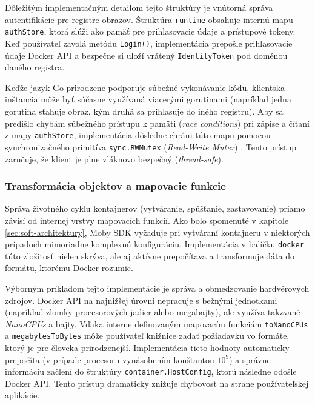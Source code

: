 \documentclass[
 program=infpvs,
  language=slovak,
  figures=false,
  tables=false,
  sourcecodes,
  glossaries,
  index
]{kidiplom}
\begin{document}
{Dôležitým implementačným detailom tejto štruktúry je vnútorná správa autentifikácie pre registre obrazov. Štruktúra \texttt{runtime} obsahuje internú mapu \texttt{authStore}, ktorá slúži ako pamäť pre prihlasovacie údaje a prístupové tokeny. Keď používateľ zavolá metódu \texttt{Login()}, implementácia prepošle prihlasovacie údaje Docker API a bezpečne si uloží vrátený \texttt{IdentityToken} pod doménou daného registra. 

Keďže jazyk Go prirodzene podporuje súbežné vykonávanie kódu, klientska inštancia môže byť súčasne využívaná viacerými gorutinami (napríklad jedna gorutina sťahuje obraz, kým druhá sa prihlasuje do iného registru). Aby sa predišlo chybám súbežného prístupu k pamäti (\textit{race conditions}) pri zápise a čítaní z mapy \texttt{authStore}, implementácia dôsledne chráni túto mapu pomocou synchronizačného primitíva \texttt{sync.RWMutex} (\textit{Read-Write Mutex}) \cite{go-sync-rwmutex}. Tento prístup zaručuje, že klient je plne vláknovo bezpečný (\textit{thread-safe}).



\subsubsection{Transformácia objektov a mapovacie funkcie}  \label{sec:mapovanie}
Správa životného cyklu kontajnerov (vytváranie, spúšťanie, zastavovanie) priamo závisí od internej vrstvy mapovacích funkcií. Ako bolo spomenuté v kapitole \ref{sec:soft-architektury}, Moby SDK vyžaduje pri vytváraní kontajneru v niektorých prípadoch mimoriadne komplexnú konfiguráciu. Implementácia v balíčku \texttt{docker} túto zložitosť nielen skrýva, ale aj aktívne prepočítava a transformuje dáta do formátu, ktorému Docker rozumie.

Výborným príkladom tejto implementácie je správa a obmedzovanie hardvérových zdrojov. Docker API na najnižšej úrovni nepracuje s bežnými jednotkami (napríklad zlomky procesorových jadier alebo megabajty), ale využíva takzvané \textit{NanoCPUs} a bajty. Vďaka interne definovaným mapovacím funkciám \texttt{toNanoCPUs} a \texttt{megabytesToBytes} môže používateľ knižnice zadať požiadavku vo formáte, ktorý je pre človeka prirodzenejší. Implementácia tieto hodnoty automaticky prepočíta (v prípade procesoru vynásobením konštantou $10^9$) a správne informáciu začlení do štruktúry \texttt{container.HostConfig}, ktorú následne odošle Docker API. Tento prístup dramaticky znižuje chybovosť na strane používateľskej aplikácie.



}
\end{document}

